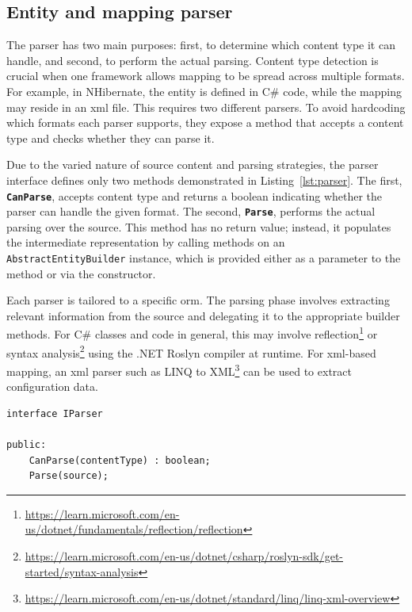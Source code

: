 \subsection{Entity and mapping parser}
The parser has two main purposes: first, to determine which content type it can handle, and second, to perform the actual parsing. Content type detection is crucial when one framework allows mapping to be spread across multiple formats. For example, in NHibernate, the entity is defined in C\# code, while the mapping may reside in an \acrshort{xml} file. This requires two different parsers. To avoid hardcoding which formats each parser supports, they expose a method that accepts a content type and checks whether they can parse it.

Due to the varied nature of source content and parsing strategies, the parser interface defines only two methods demonstrated in Listing~\ref{lst:parser}. The first, \texttt{\textbf{CanParse}}, accepts content type and returns a boolean indicating whether the parser can handle the given format. The second, \texttt{\textbf{Parse}}, performs the actual parsing over the source. This method has no return value; instead, it populates the intermediate representation by calling methods on an \texttt{AbstractEntityBuilder} instance, which is provided either as a parameter to the method or via the constructor.

Each parser is tailored to a specific \acrshort{orm}. The parsing phase involves extracting relevant information from the source and delegating it to the appropriate builder methods. For C\# classes and code in general, this may involve  reflection\footnote{\url{https://learn.microsoft.com/en-us/dotnet/fundamentals/reflection/reflection}} or syntax analysis\footnote{\url{https://learn.microsoft.com/en-us/dotnet/csharp/roslyn-sdk/get-started/syntax-analysis}} using the .NET Roslyn compiler at runtime. For \acrshort{xml}-based mapping, an \acrshort{xml} parser such as LINQ to XML\footnote{\url{https://learn.microsoft.com/en-us/dotnet/standard/linq/linq-xml-overview}} can be used to extract configuration data.

 \begin{lstlisting}[caption={IParser interface structure}, language=pseudo, label={lst:parser}]
interface IParser

public:
    CanParse(contentType) : boolean;
    Parse(source);
 \end{lstlisting}

